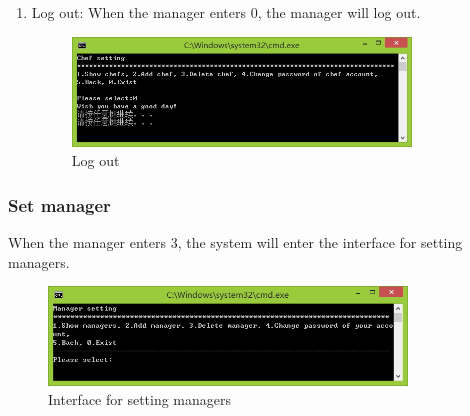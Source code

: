 \documentclass{article}
\begin{document}
\begin{enumerate}
    \item Log out:\newline
    When the manager enters 0, the manager will log out.
        \begin{figure}[H]
        \centering
        \includegraphics[width=0.85\textwidth]{B/B0.jpg}
        \caption{Log out}
        \end{figure}
    
\end{enumerate}


\subsubsection{Set manager}
When the manager enters 3, the system will enter the interface for setting managers.
\begin{figure}[H]
    \centering
    \includegraphics[width=0.85\textwidth]{C/02.jpg}
    \caption{Interface for setting managers}
\end{figure}
\end{document}
